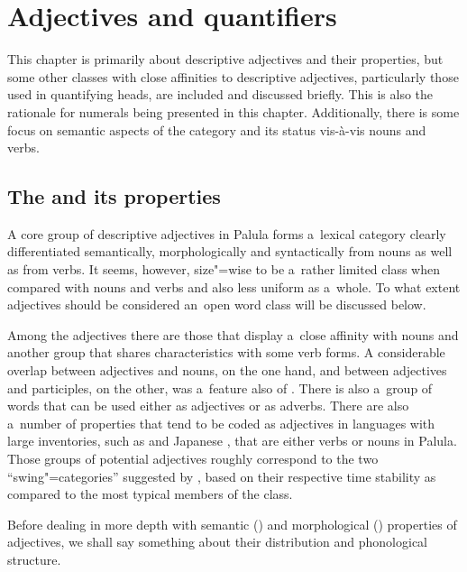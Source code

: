 \chapter{Adjectives and quantifiers}
\label{chap:6}

This chapter is primarily about descriptive adjectives and their properties, but some other classes with close affinities to descriptive adjectives, particularly those used in quantifying  heads, are included and discussed briefly. This is also the rationale for numerals being presented in this chapter. Additionally, there is some focus on semantic aspects of the  category and its status vis-à-vis nouns and verbs.


\section{The  and its properties}
\label{sec:6-1}


A core group of descriptive adjectives in Palula forms a~lexical category clearly differentiated semantically, morphologically and syntactically from nouns as well as from verbs. It seems, however, size"=wise to be a~rather limited class when compared with nouns and verbs and also less uniform as a~whole. To what extent adjectives should be considered an~open word class will be discussed below. 



Among the adjectives there are those that display a~close affinity with nouns and another group that shares characteristics with some verb forms. A considerable overlap between adjectives and nouns, on the one hand, and between adjectives and participles, on the other, was a~feature also of  \citep[322, 967]{whitney1960}. There is also a~group of words that can be used either as adjectives or as adverbs. There are also a~number of properties that tend to be coded as adjectives in languages with large inventories, such as  and Japanese \citep[60]{pustet2006}, that are either verbs or nouns in Palula. Those groups of potential adjectives roughly correspond to the two ``swing"=categories'' suggested by \citet[321]{givon1979}, based on their respective time stability as compared to the most typical members of the class.



Before dealing in more depth with semantic () and morphological () properties of adjectives, we shall say something about their distribution and phonological structure. 



